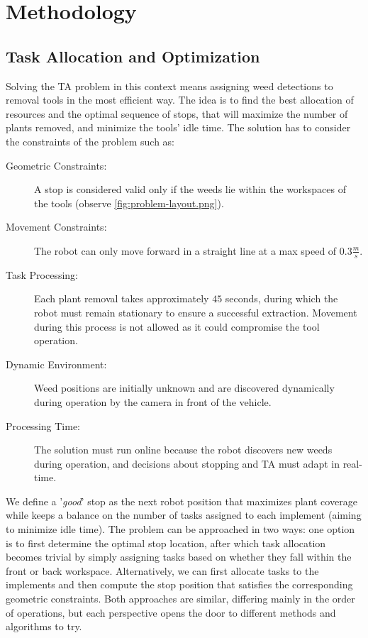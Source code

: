 \chapter{Methodology}\label{ch:methodology}
\section{Task Allocation and Optimization}\label{sec:TA}
 Solving the \ac{TA} problem in this context means assigning weed detections to removal tools in the most efficient way. The idea is to find the best allocation of resources and the optimal sequence of stops, that will maximize the number of plants removed, and minimize the tools' idle time. The solution has to consider the constraints of the problem such as:

\begin{description}
    \item[Geometric Constraints:] A stop is considered valid only if the weeds lie within the workspaces of the tools (observe \autoref{fig:problem-layout.png}).
    \item[Movement Constraints:] The robot can only move forward in a straight line at a max speed of $0.3\frac{m}{s}$. %
    \item[Task Processing:] Each plant removal takes approximately $45$ seconds, during which the robot must remain stationary to ensure a successful extraction. Movement during this process is not allowed as it could compromise the tool operation.
    \item[Dynamic Environment:] Weed positions are initially unknown and are discovered dynamically during operation by the camera in front of the vehicle.
    \item[Processing Time:] The solution must run online because the robot discovers new weeds during operation, and decisions about stopping and \ac{TA} must adapt in real-time.
\end{description}

We define a '\textit{good}' stop as the next robot position that maximizes plant coverage while keeps a balance on the number of tasks assigned to each implement (aiming to minimize idle time). The problem can be approached in two ways: one option is to first determine the optimal stop location, after which task allocation becomes trivial by simply assigning tasks based on whether they fall within the front or back workspace. Alternatively, we can first allocate tasks to the implements and then compute the stop position that satisfies the corresponding geometric constraints. Both approaches are similar, differing mainly in the order of operations, but each perspective opens the door to different methods and algorithms to try.

